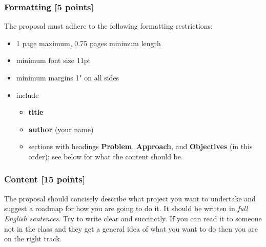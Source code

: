 \documentclass[letterpaper]{scrartcl}
\begin{document}
\subsubsection{Formatting [5 points]}
\label{sec:formatting}

The proposal must adhere to the following formatting restrictions:
\begin{itemize}
\item 1 page maximum, 0.75 pages minimum length
\item minimum font size 11pt
\item minimum margins 1" on all sides
\item include
  \begin{itemize}
  \item \textbf{title}
  \item \textbf{author} (your name)
  \item sections with headings \textbf{Problem}, \textbf{Approach},
    and \textbf{Objectives} (in this order); see below for what the
    content should be.
  \end{itemize}
\end{itemize}

\subsubsection{Content [15 points]}
\label{sec:content}

The proposal should concisely describe what project you want to
undertake and suggest a roadmap for how you are going to do it. It
should be written in \emph{full English sentences}. Try to write clear
and succinctly. If you can read it to someone not in the class and they
get a general idea of what you want to do then you are on the right
track.
\end{document}
